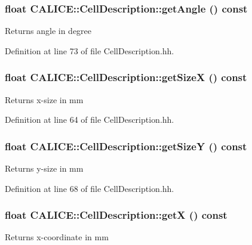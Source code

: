 \subsubsection[{getAngle}]{\setlength{\rightskip}{0pt plus 5cm}float CALICE::CellDescription::getAngle () const\hspace{0.3cm}{\ttfamily  [inline]}}\label{classCALICE_1_1CellDescription_ad8787802904670e475b34ddb3c2ca112}
\begin{DoxyReturn}{Returns}
angle in degree 
\end{DoxyReturn}


Definition at line 73 of file CellDescription.hh.
\subsubsection[{getSizeX}]{\setlength{\rightskip}{0pt plus 5cm}float CALICE::CellDescription::getSizeX () const\hspace{0.3cm}{\ttfamily  [inline]}}\label{classCALICE_1_1CellDescription_ae601ec372a54c912ad9f8f5b419f1d3f}
\begin{DoxyReturn}{Returns}
x-\/size in mm 
\end{DoxyReturn}


Definition at line 64 of file CellDescription.hh.
\subsubsection[{getSizeY}]{\setlength{\rightskip}{0pt plus 5cm}float CALICE::CellDescription::getSizeY () const\hspace{0.3cm}{\ttfamily  [inline]}}\label{classCALICE_1_1CellDescription_a1094fa4e30be6fe85b37e520846a48ab}
\begin{DoxyReturn}{Returns}
y-\/size in mm 
\end{DoxyReturn}


Definition at line 68 of file CellDescription.hh.
\subsubsection[{getX}]{\setlength{\rightskip}{0pt plus 5cm}float CALICE::CellDescription::getX () const\hspace{0.3cm}{\ttfamily  [inline]}}\label{classCALICE_1_1CellDescription_ae14c60a3ed854a88aca2d97d230f4bfb}
\begin{DoxyReturn}{Returns}
x-\/coordinate in mm 
\end{DoxyReturn}


